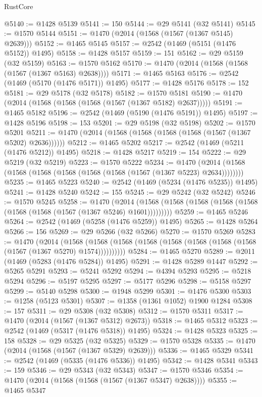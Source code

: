 \begin{lexlean}{RustCore}
\begin{coremodule}
@5140 := @1428 @5139
@5141 := 150
@5144 := @29 @5141 (@32 @5141)
@5145 := @1570 @5144
@5151 := @1470 (@2014 (@1568 (@1567 (@1367 @5145) @2639)))
@5152 := @1465 @5145
@5157 := @2542 (@1469 (@5151 (@1476 @5152)) @1495)
@5158 := @1428 @5157
@5159 := 151
@5162 := @29 @5159 (@32 @5159)
@5163 := @1570 @5162
@5170 := @1470 (@2014 (@1568 (@1568 (@1567 (@1367 @5163) @2638))))
@5171 := @1465 @5163
@5176 := @2542 (@1469 (@5170 (@1476 @5171)) @1495)
@5177 := @1428 @5176
@5178 := 152
@5181 := @29 @5178 (@32 @5178)
@5182 := @1570 @5181
@5190 := @1470 (@2014 (@1568 (@1568 (@1568 (@1567 (@1367 @5182) @2637)))))
@5191 := @1465 @5182
@5196 := @2542 (@1469 (@5190 (@1476 @5191)) @1495)
@5197 := @1428 @5196
@5198 := 153
@5201 := @29 @5198 (@32 @5198)
@5202 := @1570 @5201
@5211 := @1470 (@2014 (@1568 (@1568 (@1568 (@1568 (@1567 (@1367 @5202) @2636))))))
@5212 := @1465 @5202
@5217 := @2542 (@1469 (@5211 (@1476 @5212)) @1495)
@5218 := @1428 @5217
@5219 := 154
@5222 := @29 @5219 (@32 @5219)
@5223 := @1570 @5222
@5234 := @1470 (@2014 (@1568 (@1568 (@1568 (@1568 (@1568 (@1568 (@1567 (@1367 @5223) @2634))))))))
@5235 := @1465 @5223
@5240 := @2542 (@1469 (@5234 (@1476 @5235)) @1495)
@5241 := @1428 @5240
@5242 := 155
@5245 := @29 @5242 (@32 @5242)
@5246 := @1570 @5245
@5258 := @1470
    (@2014 (@1568 (@1568 (@1568 (@1568 (@1568 (@1568 (@1568 (@1567 (@1367 @5246) @1601)))))))))
@5259 := @1465 @5246
@5264 := @2542 (@1469 (@5258 (@1476 @5259)) @1495)
@5265 := @1428 @5264
@5266 := 156
@5269 := @29 @5266 (@32 @5266)
@5270 := @1570 @5269
@5283 := @1470
    (@2014
      (@1568 (@1568 (@1568 (@1568 (@1568 (@1568 (@1568 (@1568 (@1567 (@1367 @5270) @1574))))))))))
@5284 := @1465 @5270
@5289 := @2011 (@1469 (@5283 (@1476 @5284)) @1495)
@5291 := @1428 @5289 @1447
@5292 := @5265 @5291
@5293 := @5241 @5292
@5294 := @4394 @5293
@5295 := @5218 @5294
@5296 := @5197 @5295
@5297 := @5177 @5296
@5298 := @5158 @5297
@5299 := @5140 @5298
@5300 := @1948 @5299
@5301 := @1476 @5300
@5303 := @1258 (@5123 @5301)
@5307 := @1358 (@1361 @1052) @1900 @1284
@5308 := 157
@5311 := @29 @5308 (@32 @5308)
@5312 := @1570 @5311
@5317 := @1470 (@2014 (@1567 (@1367 @5312) @2673))
@5318 := @1465 @5312
@5323 := @2542 (@1469 (@5317 (@1476 @5318)) @1495)
@5324 := @1428 @5323
@5325 := 158
@5328 := @29 @5325 (@32 @5325)
@5329 := @1570 @5328
@5335 := @1470 (@2014 (@1568 (@1567 (@1367 @5329) @2639)))
@5336 := @1465 @5329
@5341 := @2542 (@1469 (@5335 (@1476 @5336)) @1495)
@5342 := @1428 @5341
@5343 := 159
@5346 := @29 @5343 (@32 @5343)
@5347 := @1570 @5346
@5354 := @1470 (@2014 (@1568 (@1568 (@1567 (@1367 @5347) @2638))))
@5355 := @1465 @5347

\end{coremodule}
\end{lexlean}
